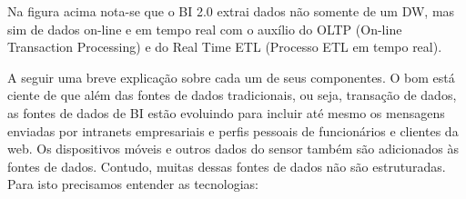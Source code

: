 Na figura acima nota-se que o BI 2.0 extrai dados n\~{a}o somente de um DW, mas sim de dados on-line e em tempo real com o aux\'{i}lio do OLTP (On-line Transaction Processing) e do Real Time ETL (Processo ETL em tempo real).

A seguir uma breve explica\c{c}\~{a}o sobre cada um de seus componentes. O bom est\'{a} ciente de que al\'{e}m das fontes de dados tradicionais, ou seja, transa\c{c}\~{a}o de dados, as fontes de dados de BI est\~{a}o evoluindo para incluir at\'{e} mesmo os mensagens enviadas por intranets empresariais e perfis pessoais de funcion\'{a}rios e clientes da web. Os dispositivos m\'{o}veis e outros dados do sensor tamb\'{e}m s\~{a}o adicionados \`{a}s fontes de dados. Contudo, muitas dessas fontes de dados n\~{a}o s\~{a}o estruturadas. Para isto precisamos entender as tecnologias:


